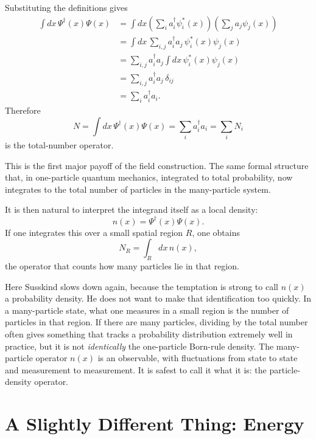 Substituting the definitions gives
\begin{align}
\int dx\,\Psi^\dagger(x)\Psi(x)
&=\int dx
\left(\sum_i a_i^\dagger\psi_i^*(x)\right)
\left(\sum_j a_j\psi_j(x)\right) \\
&=\int dx\,\sum_{i,j} a_i^\dagger a_j\,\psi_i^*(x)\psi_j(x) \\
&=\sum_{i,j} a_i^\dagger a_j \int dx\,\psi_i^*(x)\psi_j(x) \\
&=\sum_{i,j} a_i^\dagger a_j\,\delta_{ij} \\
&=\sum_i a_i^\dagger a_i.
\end{align}
Therefore
\begin{equation}
N=\int dx\,\Psi^\dagger(x)\Psi(x)=\sum_i a_i^\dagger a_i=\sum_i N_i
\end{equation}
is the total-number operator.

This is the first major payoff of the field construction. The same formal structure that, in one-particle quantum mechanics, integrated to total probability, now integrates to the total number of particles in the many-particle system.

It is then natural to interpret the integrand itself as a local density:
\begin{equation}
n(x)=\Psi^\dagger(x)\Psi(x).
\end{equation}
If one integrates this over a small spatial region $R$, one obtains
\begin{equation}
N_R=\int_R dx\,n(x),
\end{equation}
the operator that counts how many particles lie in that region.

Here Susskind slows down again, because the temptation is strong to call $n(x)$ a probability density. He does not want to make that identification too quickly. In a many-particle state, what one measures in a small region is the number of particles in that region. If there are many particles, dividing by the total number often gives something that tracks a probability distribution extremely well in practice, but it is not \emph{identically} the one-particle Born-rule density. The many-particle operator $n(x)$ is an observable, with fluctuations from state to state and measurement to measurement. It is safest to call it what it is: the particle-density operator.

\section{A Slightly Different Thing: Energy}

